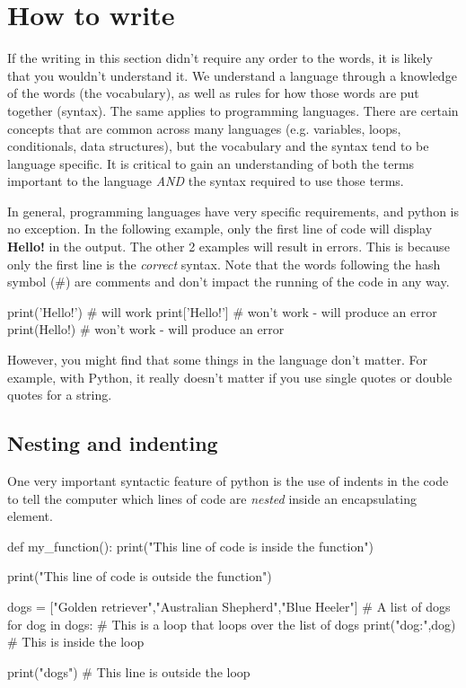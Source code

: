 \section{How to write}

If the writing in this section didn't require any order to the words, it is likely that you wouldn't understand it. We understand a language through a knowledge of the words (the vocabulary), as well as rules for how those words are put together (syntax). The same applies to programming languages. There are certain concepts that are common across many languages (e.g. variables, loops, conditionals, data structures), but the vocabulary and the syntax tend to be language specific. It is critical to gain an understanding of both the terms important to the language \textit{AND} the syntax required to use those terms.

In general, programming languages have very specific requirements, and python is no exception. In the following example, only the first line of code will display \textbf{Hello!} in the output. The other 2 examples will result in errors. This is because only the first line is the \textit{correct} syntax. Note that the words following the hash symbol (\#) are comments and don't impact the running of the code in any way.

\begin{pycode}
    print('Hello!') # will work
    print['Hello!'] # won't work - will produce an error
    print(Hello!) # won't work - will produce an error
\end{pycode}

However, you might find that some things in the language don't matter. For example, with Python, it really doesn't matter if you use single quotes or double quotes for a string.

\subsection{Nesting and indenting}

One very important syntactic feature of python is the use of indents in the code to tell the computer which lines of code are \textit{nested} inside an encapsulating element.

\begin{pycode}
    def my_function():
        print("This line of code is inside the function")

    print("This line of code is outside the function")

    dogs = ["Golden retriever","Australian Shepherd","Blue Heeler"] # A list of dogs
    for dog in dogs: # This is a loop that loops over the list of dogs
        print("dog:",dog) # This is inside the loop

    print("dogs") # This line is outside the loop
\end{pycode}


